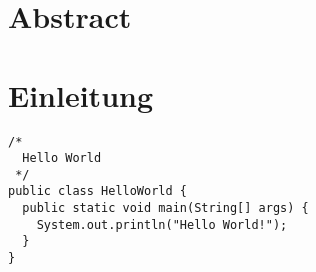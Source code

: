\documentclass[a4paper, 10pt, DIV=13, BCOR=8mm]{scrbook}
\begin{document}
\chapter*{Abstract}

\blindtext



\tableofcontents


\chapter{Einleitung}

\blindtext

\begin{verbatim}
/*
  Hello World
 */
public class HelloWorld {
  public static void main(String[] args) {
    System.out.println("Hello World!");
  }
}
\end{verbatim}

\blindtext

\Blinddocument
\end{document}
